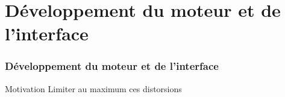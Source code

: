 \section{Développement du moteur et de l'interface}
	\begin{frame}
		\frametitle{Développement du moteur et de l'interface}
		\begin{block}{Motivation}
			Limiter au maximum ces distorsions
		\end{block}	
\end{frame}